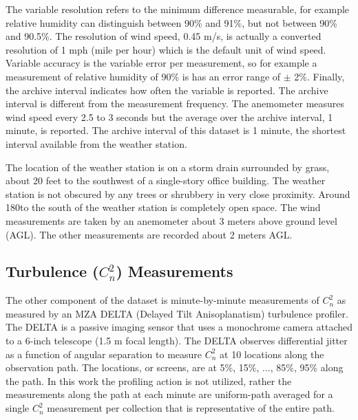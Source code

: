 The variable resolution refers to the minimum difference measurable, for example relative humidity can distinguish between 90\% and 91\%, but not between 90\% and 90.5\%. The resolution of wind speed, 0.45 m/s, is actually a converted resolution of 1 mph (mile per hour) which is the default unit of wind speed. Variable accuracy is the variable error per measurement, so for example a measurement of relative humidity of 90\% is has an error range of $\pm$ 2\%. Finally, the archive interval indicates how often the variable is reported. The archive interval is different from the measurement frequency. The anemometer measures wind speed every 2.5 to 3 seconds but the average over the archive interval, 1 minute, is reported. The archive interval of this dataset is 1 minute, the shortest interval available from the weather station.

The location of the weather station is on a storm drain surrounded by grass, about 20 feet to the southwest of a single-story office building. The weather station is not obscured by any trees or shrubbery in very close proximity. Around 180\textdegree to the south of the weather station is completely open space. The wind measurements are taken by an anemometer about 3 meters above ground level (AGL). The other measurements are recorded about 2 meters AGL.

\subsection{Turbulence ($C_{n}^{2}$) Measurements}
\label{sec:summary_tub_meas}
The other component of the dataset is minute-by-minute measurements of $C_{n}^{2}$ as measured by an MZA DELTA (Delayed Tilt Anisoplanatism) turbulence profiler. The DELTA is a passive imaging sensor that uses a monochrome camera attached to a 6-inch telescope (1.5 m focal length). The DELTA observes differential jitter as a function of angular separation to measure $C_{n}^{2}$ at 10 locations along the observation path. The locations, or screens, are at 5\%, 15\%, ..., 85\%, 95\% along the path. In this work the profiling action is not utilized, rather the measurements along the path at each minute are uniform-path averaged for a single $C_{n}^{2}$ measurement per collection that is representative of the entire path.

